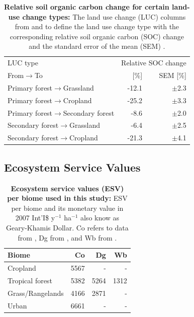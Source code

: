 		\begin{table}[ht]
			\centering
			\caption[Relative soil organic carbon change for certain land-use change types]{\textbf{Relative soil organic carbon change for certain land-use change types:} The land use change (LUC) columns from and to define the land use change type with the corresponding relative soil organic carbon (SOC) change and the standard error of the mean (SEM) \citep{Don2010}.}
			\label{tab:soc_factors}
			\begin{tabular}{lrr}
				\hline
				LUC type & \multicolumn{2}{c}{Relative SOC change} \\\cline{2-3}
				From$\rightarrow$To & [\%] & SEM [\%] \\\hline
				Primary forest$\rightarrow$Grassland & -12.1 & $\pm$2.3 \\
				Primary forest$\rightarrow$Cropland & -25.2 & $\pm$3.3 \\
				Primary forest$\rightarrow$Secondary forest & -8.6 & $\pm$2.0 \\
				Secondary forest$\rightarrow$Grassland & -6.4 & $\pm$2.5 \\
				Secondary forest$\rightarrow$Cropland & -21.3 & $\pm$4.1 \\\hline
			\end{tabular}
		\end{table}

	\subsection{Ecosystem Service Values}
	\label{subsec:methods_data_esv}
		\begin{table}[ht]
			\centering
			\caption[Ecosystem service values (ESV) used in this study]{\textbf{Ecosystem service values (ESV) per biome used in this study:} ESV per biome and its monetary value in 2007 Int'I\$ y$^{-1}$ ha$^{-1}$ also know as Geary-Khamis Dollar. Co refers to data from \citet{Costanza2014}, Dg from \citet{Groot2012}, and Wb from \citet{Siikamaki2015}.}
			\label{tab:esv_factors}
			\begin{tabular}{lrrr}
				\hline
				Biome & Co & Dg & Wb \\\hline
				Cropland & 5567 & - & -\\
				Tropical forest & 5382 & 5264 & 1312\\
				Grass/Rangelands & 4166 & 2871 & -\\
				Urban & 6661 & - & -\\\hline
			\end{tabular}
		\end{table}

